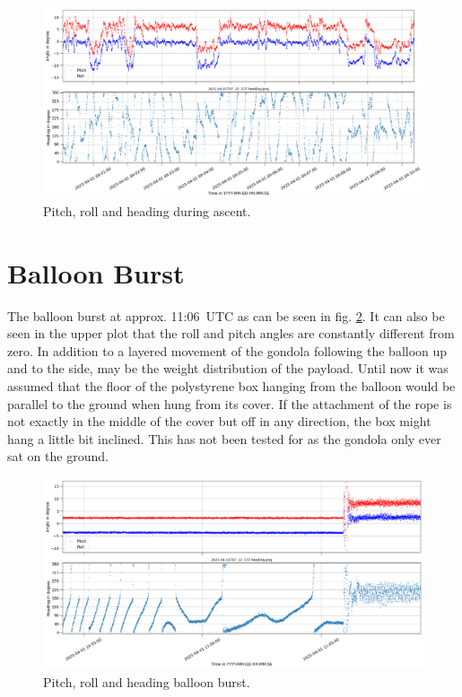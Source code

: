 \begin{figure}[H]
    \centering
    \includegraphics[width=\linewidth]{images/04_results/mid_flight_heading.png}
    \caption[Heading during ascent.]{Pitch, roll and heading during ascent.}
    \label{fig:res:ascent_heading}
\end{figure}


\section{Balloon Burst \label{sec:balloon_burst}}
The balloon burst at approx. 11:06~UTC as can be seen in fig. \ref{fig:res:burst_heading}. It can also be seen in the upper plot that the roll and pitch angles are constantly different from zero. In addition to a layered movement of the gondola following the balloon up and to the side, may be the weight distribution of the payload. Until now it was assumed that the floor of the polystyrene box hanging from the balloon would be parallel to the ground when hung from its cover. If the attachment of the rope is not exactly in the middle of the cover but off in any direction, the box might hang a little bit inclined. This has not been tested for as the gondola only ever sat on the ground. 

\begin{figure}[H]
    \centering
    \includegraphics[width=\linewidth]{images/04_results/pop_heading.png}
    \caption[Heading at balloon burst.]{Pitch, roll and heading balloon burst.}
    \label{fig:res:burst_heading}
\end{figure}


